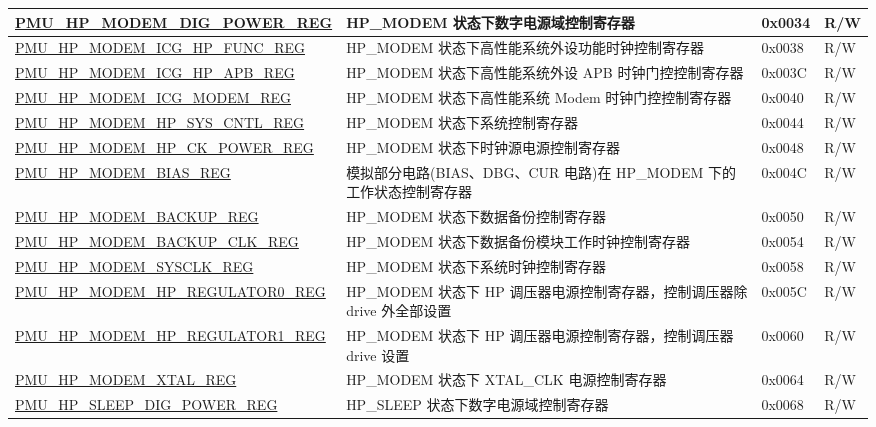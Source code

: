 \begin{longtable}{ | p{6.5cm} | p{8cm} | p{1.3cm} | p{1cm} | }
\hyperref[regdesc:PMUHPMODEMDIGPOWERREG]{PMU\_HP\_MODEM\_DIG\_POWER\_REG} & HP\_MODEM 状态下数字电源域控制寄存器 & 0x0034 & R/W \\ \hline
\hyperref[regdesc:PMUHPMODEMICGHPFUNCREG]{PMU\_HP\_MODEM\_ICG\_HP\_FUNC\_REG} & HP\_MODEM 状态下高性能系统外设功能时钟控制寄存器 & 0x0038 & R/W \\ \hline
\hyperref[regdesc:PMUHPMODEMICGHPAPBREG]{PMU\_HP\_MODEM\_ICG\_HP\_APB\_REG} & HP\_MODEM 状态下高性能系统外设 APB 时钟门控控制寄存器 & 0x003C & R/W \\ \hline
\hyperref[regdesc:PMUHPMODEMICGMODEMREG]{PMU\_HP\_MODEM\_ICG\_MODEM\_REG} & HP\_MODEM 状态下高性能系统 Modem 时钟门控控制寄存器 & 0x0040 & R/W \\ \hline
\hyperref[regdesc:PMUHPMODEMHPSYSCNTLREG]{PMU\_HP\_MODEM\_HP\_SYS\_CNTL\_REG} & HP\_MODEM 状态下系统控制寄存器 & 0x0044 & R/W \\ \hline
\hyperref[regdesc:PMUHPMODEMHPCKPOWERREG]{PMU\_HP\_MODEM\_HP\_CK\_POWER\_REG} & HP\_MODEM 状态下时钟源电源控制寄存器 & 0x0048 & R/W \\ \hline
\hyperref[regdesc:PMUHPMODEMBIASREG]{PMU\_HP\_MODEM\_BIAS\_REG} & 模拟部分电路(BIAS、DBG、CUR 电路)在 HP\_MODEM 下的工作状态控制寄存器 & 0x004C & R/W \\ \hline
\hyperref[regdesc:PMUHPMODEMBACKUPREG]{PMU\_HP\_MODEM\_BACKUP\_REG} & HP\_MODEM 状态下数据备份控制寄存器 & 0x0050 & R/W \\ \hline
\hyperref[regdesc:PMUHPMODEMBACKUPCLKREG]{PMU\_HP\_MODEM\_BACKUP\_CLK\_REG} & HP\_MODEM 状态下数据备份模块工作时钟控制寄存器 & 0x0054 & R/W \\ \hline
\hyperref[regdesc:PMUHPMODEMSYSCLKREG]{PMU\_HP\_MODEM\_SYSCLK\_REG} & HP\_MODEM 状态下系统时钟控制寄存器  & 0x0058 & R/W \\ \hline
\hyperref[regdesc:PMUHPMODEMHPREGULATOR0REG]{PMU\_HP\_MODEM\_HP\_REGULATOR0\_REG} & HP\_MODEM 状态下 HP 调压器电源控制寄存器，控制调压器除 drive 外全部设置 & 0x005C & R/W \\ \hline
\hyperref[regdesc:PMUHPMODEMHPREGULATOR1REG]{PMU\_HP\_MODEM\_HP\_REGULATOR1\_REG} & HP\_MODEM 状态下 HP 调压器电源控制寄存器，控制调压器 drive 设置 & 0x0060 & R/W \\ \hline
\hyperref[regdesc:PMUHPMODEMXTALREG]{PMU\_HP\_MODEM\_XTAL\_REG} & HP\_MODEM 状态下 XTAL\_CLK 电源控制寄存器 & 0x0064 & R/W \\ \hline
\hyperref[regdesc:PMUHPSLEEPDIGPOWERREG]{PMU\_HP\_SLEEP\_DIG\_POWER\_REG} & HP\_SLEEP 状态下数字电源域控制寄存器 & 0x0068 & R/W \\ \hline

\end{longtable}
